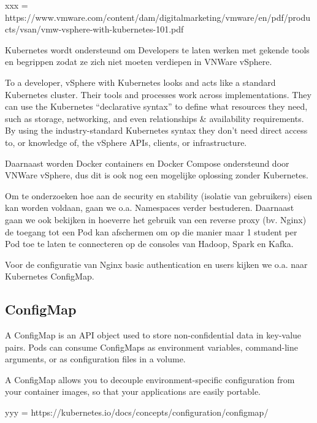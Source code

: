 xxx = https://www.vmware.com/content/dam/digitalmarketing/vmware/en/pdf/products/vsan/vmw-vsphere-with-kubernetes-101.pdf

Kubernetes wordt ondersteund om Developers te laten werken met gekende tools en begrippen zodat ze zich niet moeten verdiepen in VNWare vSphere.

To a developer, vSphere with Kubernetes looks and acts like a standard Kubernetes cluster. Their tools and processes work across implementations. They can use the Kubernetes “declarative syntax” to define what resources they need, such as storage, networking, and even relationships & availability requirements. By using the industry-standard Kubernetes syntax they don’t need direct access to, or knowledge of, the vSphere APIs, clients, or infrastructure.\autocite{xxx}

Daarnaast worden Docker containers en Docker Compose ondersteund door VNWare vSphere, dus dit is ook nog een mogelijke oplossing zonder Kubernetes. 


Om te onderzoeken hoe aan de security en stability (isolatie van gebruikers) eisen kan worden voldaan, gaan we o.a. Namespaces verder bestuderen. Daarnaast gaan we ook bekijken in hoeverre het gebruik van een reverse proxy (bv. Nginx) de toegang tot een Pod kan afschermen om op die manier maar 1 student per Pod toe te laten te connecteren op de consoles van Hadoop, Spark en Kafka.

Voor de configuratie van Nginx basic authentication en users kijken we o.a. naar Kubernetes ConfigMap.

\subsection{ConfigMap}
A ConfigMap is an API object used to store non-confidential data in key-value pairs. Pods can consume ConfigMaps as environment variables, command-line arguments, or as configuration files in a volume.

A ConfigMap allows you to decouple environment-specific configuration from your container images, so that your applications are easily portable.\autocite{yyy}

yyy = https://kubernetes.io/docs/concepts/configuration/configmap/

